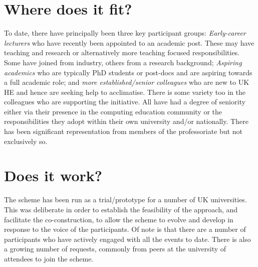 \documentclass[sigconf]{acmart}
\begin{document}
\section{Where does it fit?}
To date, there have principally been three key participant groups:
{\emph{Early-career lecturers}} who have recently been appointed to an
academic post. These may have teaching and research or alternatively
more teaching focused responsibilities. Some have joined from
industry, others from a research background; {\emph{Aspiring
academics}} who are typically PhD students or post-docs and are
aspiring towards a full academic role; and {\emph{more
established/senior colleagues}} who are new to UK HE and hence are
seeking help to acclimatise. There is some variety too in the
colleagues who are supporting the initiative. All have had a degree of
seniority either via their presence in the computing education
community or the responsibilities they adopt within their own
university and/or nationally. There has been significant
representation from members of the professoriate but not exclusively
so.

\section{Does it work?}	
\label{Sec:DoesItWork}
The scheme has been run as a trial/prototype for a number of UK
universities. This was deliberate in order to establish the
feasibility of the approach, and facilitate the co-construction, to
allow the scheme to evolve and develop in response to the voice of the
participants. Of note is that there are a number of participants who
have actively engaged with all the events to date. There is also a
growing number of requests, commonly from peers at the university of
attendees to join the scheme.
\end{document}

